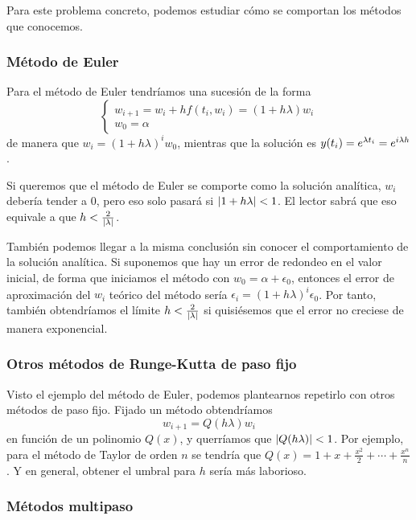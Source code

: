 Para este problema concreto,
podemos estudiar cómo se comportan los métodos que conocemos.

\subsubsection{Método de Euler}

Para el método de Euler tendríamos una sucesión de la forma
\begin{equation*}
    \begin{cases}
        w_{i+1} = w_i + hf(t_i, w_i) = (1 + h\lambda)w_i \\
        w_0 = \alpha
    \end{cases}
\end{equation*}
de manera que $w_i = (1 + h\lambda)^iw_0$, mientras que la solución es
$y(t_i) = e^{\lambda t_i} = e^{i\lambda h}$.

Si queremos que el método de Euler se comporte como la solución analítica,
$w_i$ debería tender a $0$,
pero eso solo pasará si $\abs{1 + h\lambda} < 1$.
El lector sabrá que eso equivale a que $h < \frac{2}{\abs{\lambda}}$.

También podemos llegar a la misma conclusión
sin conocer el comportamiento de la solución analítica.
Si suponemos que hay un error de redondeo en el valor inicial,
de forma que iniciamos el método con $w_0 = \alpha + \epsilon_0$,
entonces el error de aproximación del $w_i$ teórico del método sería
$\epsilon_i = (1 + h\lambda)^i\epsilon_0$.
Por tanto, también obtendríamos el límite $h < \frac{2}{\abs{\lambda}}$
si quisiésemos que el error no creciese de manera exponencial.

\subsubsection{Otros métodos de Runge-Kutta de paso fijo}

Visto el ejemplo del método de Euler,
podemos plantearnos repetirlo con otros métodos de paso fijo.
Fijado un método obtendríamos
\begin{equation}\label{eqn:polq-one-step}
    w_{i+1} = Q(h\lambda)w_i
\end{equation}
en función de un polinomio $Q(x)$,
y querríamos que $\abs{Q(h\lambda)} < 1$.
Por ejemplo, para el método de Taylor de orden $n$ se tendría que
$Q(x) = 1 + x + \frac{x^2}{2} + \cdots + \frac{x^n}{n}$.
Y en general, obtener el umbral para $h$ sería más laborioso.

\subsubsection{Métodos multipaso}

